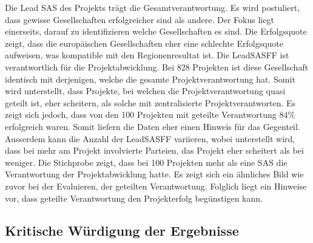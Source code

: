 \newline Die Lead SAS des Projekts trägt die Gesamtverantwortung. Es wird postuliert, dass gewisse Gesellschaften erfolgreicher sind als andere. Der Fokus liegt einerseits, darauf zu identifizieren welche Gesellschaften es sind. Die Erfolgsquote zeigt, dass die europäischen Gesellschaften eher eine schlechte Erfolgsquote aufweisen, was kompatible mit den Regionenresultat ist. Die LeadSASFF ist verantwortlich für die Projektabwicklung. Bei 828 Projekten ist diese Gesellschaft identisch mit derjenigen, welche die gesamte Projektverantwortung hat. Somit wird unterstellt, dass Projekte, bei welchen die Projektverantwortung quasi geteilt ist, eher scheitern, als solche mit zentralisierte Projektverantworten. Es zeigt sich jedoch, dass von den 100 Projekten mit geteilte Verantwortung 84\% erfolgreich waren. Somit liefern die Daten eher einen Hinweis für das Gegenteil. Ausserdem kann die Anzahl der LeadSASFF variieren, wobei unterstellt wird, dass bei mehr am Projekt involvierte Parteien, das Projekt eher scheitert als bei weniger. Die Stichprobe zeigt, dass bei 100 Projekten mehr als eine SAS die Verantwortung der Projektabwicklung hatte. Es zeigt sich ein ähnliches Bild wie zuvor bei der Evaluieren, der geteilten Verantwortung. Folglich liegt ein Hinweise vor, dass geteilte Verantwortung den Projekterfolg begünstigen kann. 
\subsection{Kritische Würdigung der Ergebnisse}
\newpage	
	


